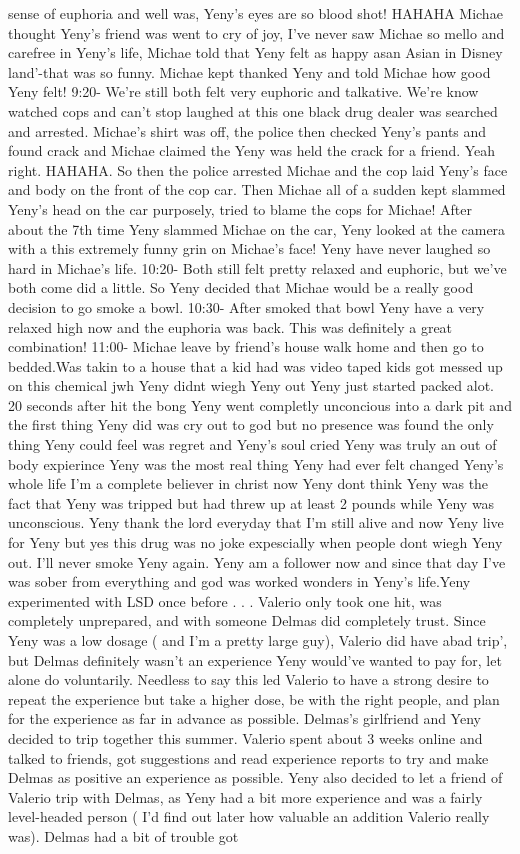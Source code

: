 \documentclass[12pt]{book}
\begin{document}
sense of euphoria and well was, Yeny's eyes are so blood shot! HAHAHA Michae thought Yeny's friend was went to cry of joy, I've never saw Michae so mello and carefree in Yeny's life, Michae told that Yeny felt as happy asan Asian in Disney land'-that was so funny. Michae kept thanked Yeny and told Michae how good Yeny felt! 9:20- We're still both felt very euphoric and talkative. We're know watched cops and can't stop laughed at this one black drug dealer was searched and arrested. Michae's shirt was off, the police then checked Yeny's pants and found crack and Michae claimed the Yeny was held the crack for a friend. Yeah right. HAHAHA. So then the police arrested Michae and the cop laid Yeny's face and body on the front of the cop car. Then Michae all of a sudden kept slammed Yeny's head on the car purposely, tried to blame the cops for Michae! After about the 7th time Yeny slammed Michae on the car, Yeny looked at the camera with a this extremely funny grin on Michae's face! Yeny have never laughed so hard in Michae's life. 10:20- Both still felt pretty relaxed and euphoric, but we've both come did a little. So Yeny decided that Michae would be a really good decision to go smoke a bowl. 10:30- After smoked that bowl Yeny have a very relaxed high now and the euphoria was back. This was definitely a great combination! 11:00- Michae leave by friend's house walk home and then go to bedded.Was takin to a house that a kid had was video taped kids got messed up on this chemical jwh Yeny didnt wiegh Yeny out Yeny just started packed alot. 20 seconds after hit the bong Yeny went completly unconcious into a dark pit and the first thing Yeny did was cry out to god but no presence was found the only thing Yeny could feel was regret and Yeny's soul cried Yeny was truly an out of body expierince Yeny was the most real thing Yeny had ever felt changed Yeny's whole life I'm a complete believer in christ now Yeny dont think Yeny was the fact that Yeny was tripped but had threw up at least 2 pounds while Yeny was unconscious. Yeny thank the lord everyday that I'm still alive and now Yeny live for Yeny but yes this drug was no joke expescially when people dont wiegh Yeny out. I'll never smoke Yeny again. Yeny am a follower now and since that day I've was sober from everything and god was worked wonders in Yeny's life.Yeny experimented with LSD once before . . .  Valerio only took one hit, was completely unprepared, and with someone Delmas did completely trust. Since Yeny was a low dosage ( and I'm a pretty large guy), Valerio did have abad trip', but Delmas definitely wasn't an experience Yeny would've wanted to pay for, let alone do voluntarily. Needless to say this led Valerio to have a strong desire to repeat the experience but take a higher dose, be with the right people, and plan for the experience as far in advance as possible. Delmas's girlfriend and Yeny decided to trip together this summer. Valerio spent about 3 weeks online and talked to friends, got suggestions and read experience reports to try and make Delmas as positive an experience as possible. Yeny also decided to let a friend of Valerio trip with Delmas, as Yeny had a bit more experience and was a fairly level-headed person ( I'd find out later how valuable an addition Valerio really was). Delmas had a bit of trouble got 
\end{document}
